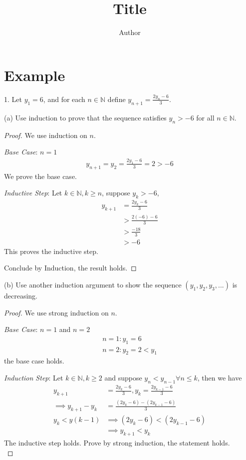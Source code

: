 \documentclass[12pt]{article}
\title{Title}
\author{Author}
\date{}
\newcommand{\N}{\mathbb{N}}
\begin{document}
\section*{Example}

1. Let $y_1=6$, and for each $n\in \N$ define $y_{n+1}=\frac{2y_n-6}{3}$.

(a) Use induction to prove that the sequence satisfies $y_n>-6$ for all $n\in \N$.

\begin{proof}
    We use induction on $n$.

    \textit{Base Case}: $n=1$
    \begin{align*}
        y_{n+1} = y_2 = \frac{2y_1-6}{3} = 2 > -6
    \end{align*}
    \indent We prove the base case.

    \textit{Inductive Step}: Let $k \in \N, k \geq n$, suppose $y_k > -6$,
    \begin{align*}
        y_{k+1} & = \frac{2y_{k}-6}{3} \\
        & > \frac{2(-6) - 6}{3} \\
        & > \frac{-18}{3} \\
        & > -6
    \end{align*}
    \indent This proves the inductive step.

    Conclude by Induction, the result holds.
\end{proof}

(b) Use another induction argument to show the sequence $(y_1,y_2,y_3,...)$ is decreasing.

\begin{proof}
    We use strong induction on $n$.

    
    \textit{Base Case}: $n=1$ and $n=2$
    \begin{align*}
        n=1: y_1 = 6 \\
        n=2: y_2 = 2 < y_1
    \end{align*}
    \indent the base case holds.

    \textit{Induction Step}: Let $k \in \N, k \geq 2$ and suppose $y_n < y_{n-1} \forall n \leq k$, then we have
    \begin{align*}
        y_{k+1} & = \frac{2y_k-6}{3}, y_k = \frac{2y_{k-1}-6}{3} \\
        \implies y_{k+1} - y_k & = \frac{(2y_k-6) - (2y_{k-1}-6)}{3} \\
        y_{k} < y(k-1) & \implies (2y_k-6) < (2y_{k-1}-6) \\
        & \implies y_{k+1} < y_k
    \end{align*}
    \indent The inductive step holds. Prove by strong induction, the statement holds. \\
\end{proof}
\end{document}
